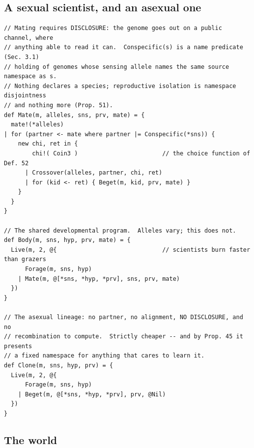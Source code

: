 \documentclass[11pt]{article}
\theoremstyle{plain}
\theoremstyle{definition}
\begin{document}
\subsection{A sexual scientist, and an asexual one}

\begin{lstlisting}
// Mating requires DISCLOSURE: the genome goes out on a public channel, where
// anything able to read it can.  Conspecific(s) is a name predicate (Sec. 3.1)
// holding of genomes whose sensing allele names the same source namespace as s.
// Nothing declares a species; reproductive isolation is namespace disjointness
// and nothing more (Prop. 51).
def Mate(m, alleles, sns, prv, mate) = {
  mate!(*alleles)
| for (partner <- mate where partner |= Conspecific(*sns)) {
    new chi, ret in {
        chi!( Coin3 )                        // the choice function of Def. 52
      | Crossover(alleles, partner, chi, ret)
      | for (kid <- ret) { Beget(m, kid, prv, mate) }
    }
  }
}

// The shared developmental program.  Alleles vary; this does not.
def Body(m, sns, hyp, prv, mate) = {
  Live(m, 2, @{                              // scientists burn faster than grazers
      Forage(m, sns, hyp)
    | Mate(m, @[*sns, *hyp, *prv], sns, prv, mate)
  })
}

// The asexual lineage: no partner, no alignment, NO DISCLOSURE, and no
// recombination to compute.  Strictly cheaper -- and by Prop. 45 it presents
// a fixed namespace for anything that cares to learn it.
def Clone(m, sns, hyp, prv) = {
  Live(m, 2, @{
      Forage(m, sns, hyp)
    | Beget(m, @[*sns, *hyp, *prv], prv, @Nil)
  })
}
\end{lstlisting}

\subsection{The world}
\end{document}
